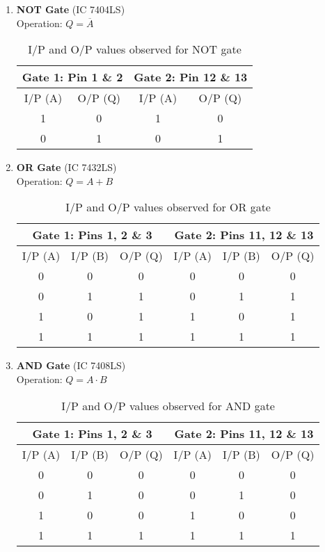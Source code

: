 \begin{enumerate}
    \item \textbf{NOT Gate} (IC 7404LS)\\
    Operation: $Q=\overline{A}$
        \begin{table}[H]
            \centering
            \begin{tabular}{|c|c|c|c|}\hline
            \multicolumn{2}{|c|}{\textbf{Gate 1: Pin 1 \& 2}} & \multicolumn{2}{c|}{\textbf{Gate 2: Pin 12 \& 13}} \\ \hline
            I/P (A) & O/P (Q) & I/P (A) & O/P (Q) \\ \hline
            1 & 0 & 1 & 0 \\ 
            0 & 1 & 0 & 1 \\ \hline
            \end{tabular}
            \caption{I/P and O/P values observed for NOT gate}
        \end{table}

    \item \textbf{OR Gate} (IC 7432LS)\\
    Operation: $Q=A+B$
        \begin{table}[H]
            \centering
            \begin{tabular}{|c|c|c|c|c|c|}\hline
            \multicolumn{3}{|c|}{\textbf{Gate 1: Pins 1, 2 \& 3}} & \multicolumn{3}{c|}{\textbf{Gate 2: Pins 11, 12 \& 13}} \\ \hline
            I/P (A) & I/P (B) & O/P (Q) & I/P (A) & I/P (B) & O/P (Q) \\ \hline
            0 & 0 & 0 & 0 & 0 & 0 \\ 
            0 & 1 & 1 & 0 & 1 & 1 \\ 
            1 & 0 & 1 & 1 & 0 & 1  \\ 
            1 & 1 & 1 & 1 & 1 & 1 \\ \hline
            \end{tabular}
            \caption{I/P and O/P values observed for OR gate}
        \end{table}

    \item \textbf{AND Gate} (IC 7408LS)\\
    Operation: $Q=A\cdot B$
        \begin{table}[H]
            \centering
            \begin{tabular}{|c|c|c|c|c|c|}\hline
            \multicolumn{3}{|c|}{\textbf{Gate 1: Pins 1, 2 \& 3}} & \multicolumn{3}{c|}{\textbf{Gate 2: Pins 11, 12 \& 13}} \\ \hline
            I/P (A) & I/P (B) & O/P (Q) & I/P (A) & I/P (B) & O/P (Q) \\ \hline
            0 & 0 & 0 & 0 & 0 & 0 \\ 
            0 & 1 & 0 & 0 & 1 & 0 \\ 
            1 & 0 & 0 & 1 & 0 & 0  \\ 
            1 & 1 & 1 & 1 & 1 & 1 \\ \hline
            \end{tabular}
            \caption{I/P and O/P values observed for AND gate}
        \end{table}


\end{enumerate}
